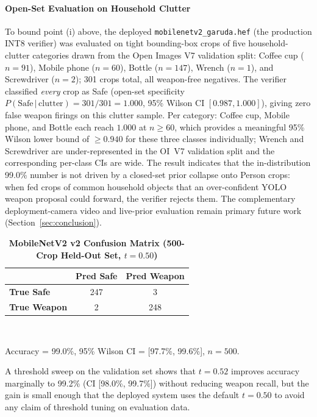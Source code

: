 \documentclass{ieeeaccess}
\begin{document}
\paragraph*{Open-Set Evaluation on Household Clutter}
To bound point (i) above, the deployed \texttt{mobilenetv2\_garuda.hef} (the production INT8 verifier) was evaluated on tight bounding-box crops of five household-clutter categories drawn from the Open Images V7 validation split: Coffee cup ($n{=}91$), Mobile phone ($n{=}60$), Bottle ($n{=}147$), Wrench ($n{=}1$), and Screwdriver ($n{=}2$); 301 crops total, all weapon-free negatives. The verifier classified \emph{every} crop as Safe (open-set specificity $P(\text{Safe}\,|\,\text{clutter}) = 301/301 = 1.000$, 95\% Wilson CI $[0.987, 1.000]$), giving zero false weapon firings on this clutter sample. Per category: Coffee cup, Mobile phone, and Bottle each reach $1.000$ at $n \geq 60$, which provides a meaningful 95\% Wilson lower bound of $\geq 0.940$ for these three classes individually; Wrench and Screwdriver are under-represented in the OI~V7 validation split and the corresponding per-class CIs are wide. The result indicates that the in-distribution 99.0\% number is not driven by a closed-set prior collapse onto Person crops: when fed crops of common household objects that an over-confident YOLO weapon proposal could forward, the verifier rejects them. The complementary deployment-camera video and live-prior evaluation remain primary future work (Section~\ref{sec:conclusion}).

\begin{table}[ht!]
\caption{\textbf{MobileNetV2 v2 Confusion Matrix (500-Crop Held-Out Set, $t{=}0.50$)}}
\label{tab:cls_confusion}
\setlength{\tabcolsep}{6pt}
\centering\small
\begin{tabular}{|l|c|c|}
\hline
 & \textbf{Pred Safe} & \textbf{Pred Weapon} \\
\hline
\textbf{True Safe}   & 247 & 3 \\
\textbf{True Weapon} & 2   & 248 \\
\hline
\end{tabular}\\[4pt]
\raggedright\scriptsize Accuracy = 99.0\%, 95\% Wilson CI = [97.7\%, 99.6\%], $n{=}500$.
\end{table}

A threshold sweep on the validation set shows that $t{=}0.52$ improves accuracy marginally to 99.2\% (CI [98.0\%, 99.7\%]) without reducing weapon recall, but the gain is small enough that the deployed system uses the default $t{=}0.50$ to avoid any claim of threshold tuning on evaluation data.
\end{document}
